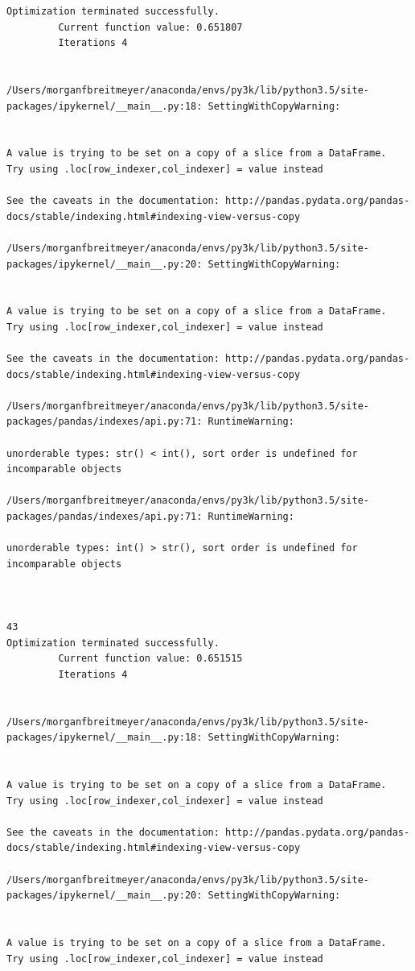 \begin{lstlisting}
Optimization terminated successfully.
         Current function value: 0.651807
         Iterations 4


/Users/morganfbreitmeyer/anaconda/envs/py3k/lib/python3.5/site-packages/ipykernel/__main__.py:18: SettingWithCopyWarning:


A value is trying to be set on a copy of a slice from a DataFrame.
Try using .loc[row_indexer,col_indexer] = value instead

See the caveats in the documentation: http://pandas.pydata.org/pandas-docs/stable/indexing.html#indexing-view-versus-copy

/Users/morganfbreitmeyer/anaconda/envs/py3k/lib/python3.5/site-packages/ipykernel/__main__.py:20: SettingWithCopyWarning:


A value is trying to be set on a copy of a slice from a DataFrame.
Try using .loc[row_indexer,col_indexer] = value instead

See the caveats in the documentation: http://pandas.pydata.org/pandas-docs/stable/indexing.html#indexing-view-versus-copy

/Users/morganfbreitmeyer/anaconda/envs/py3k/lib/python3.5/site-packages/pandas/indexes/api.py:71: RuntimeWarning:

unorderable types: str() < int(), sort order is undefined for incomparable objects

/Users/morganfbreitmeyer/anaconda/envs/py3k/lib/python3.5/site-packages/pandas/indexes/api.py:71: RuntimeWarning:

unorderable types: int() > str(), sort order is undefined for incomparable objects



43
Optimization terminated successfully.
         Current function value: 0.651515
         Iterations 4


/Users/morganfbreitmeyer/anaconda/envs/py3k/lib/python3.5/site-packages/ipykernel/__main__.py:18: SettingWithCopyWarning:


A value is trying to be set on a copy of a slice from a DataFrame.
Try using .loc[row_indexer,col_indexer] = value instead

See the caveats in the documentation: http://pandas.pydata.org/pandas-docs/stable/indexing.html#indexing-view-versus-copy

/Users/morganfbreitmeyer/anaconda/envs/py3k/lib/python3.5/site-packages/ipykernel/__main__.py:20: SettingWithCopyWarning:


A value is trying to be set on a copy of a slice from a DataFrame.
Try using .loc[row_indexer,col_indexer] = value instead


\end{lstlisting}
